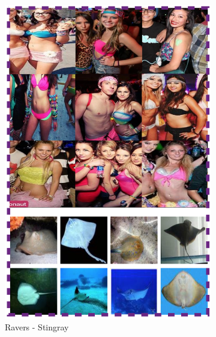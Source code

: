 \documentclass[10pt,twocolumn,letterpaper]{article}
\begin{document}
\begin{figure}[!t]
\begin{center}
\begin{subfigure}[b]{0.2\textwidth}
                \includegraphics[width=\textwidth]{feature2}
                \caption{Ravers - Stingray}
                \label{feature2}
        \end{subfigure}
                \begin{subfigure}[b]{0.2\textwidth}

\end{subfigure}
\end{center}
\end{figure}
\end{document}
